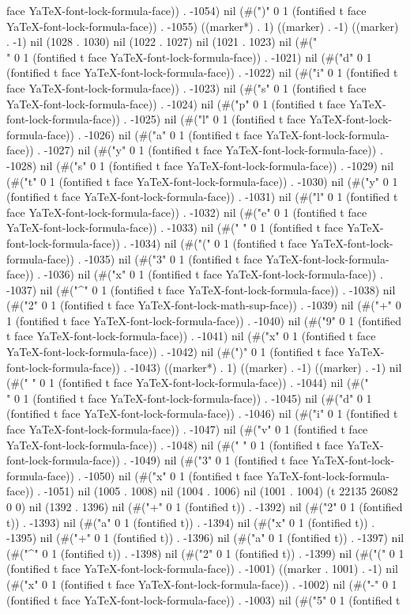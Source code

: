 face YaTeX-font-lock-formula-face)) . -1054) nil (#(")" 0 1 (fontified t face YaTeX-font-lock-formula-face)) . -1055) ((marker*) . 1) ((marker) . -1) ((marker) . -1) nil (1028 . 1030) nil (1022 . 1027) nil (1021 . 1023) nil (#("\\" 0 1 (fontified t face YaTeX-font-lock-formula-face)) . -1021) nil (#("d" 0 1 (fontified t face YaTeX-font-lock-formula-face)) . -1022) nil (#("i" 0 1 (fontified t face YaTeX-font-lock-formula-face)) . -1023) nil (#("s" 0 1 (fontified t face YaTeX-font-lock-formula-face)) . -1024) nil (#("p" 0 1 (fontified t face YaTeX-font-lock-formula-face)) . -1025) nil (#("l" 0 1 (fontified t face YaTeX-font-lock-formula-face)) . -1026) nil (#("a" 0 1 (fontified t face YaTeX-font-lock-formula-face)) . -1027) nil (#("y" 0 1 (fontified t face YaTeX-font-lock-formula-face)) . -1028) nil (#("s" 0 1 (fontified t face YaTeX-font-lock-formula-face)) . -1029) nil (#("t" 0 1 (fontified t face YaTeX-font-lock-formula-face)) . -1030) nil (#("y" 0 1 (fontified t face YaTeX-font-lock-formula-face)) . -1031) nil (#("l" 0 1 (fontified t face YaTeX-font-lock-formula-face)) . -1032) nil (#("e" 0 1 (fontified t face YaTeX-font-lock-formula-face)) . -1033) nil (#(" " 0 1 (fontified t face YaTeX-font-lock-formula-face)) . -1034) nil (#("(" 0 1 (fontified t face YaTeX-font-lock-formula-face)) . -1035) nil (#("3" 0 1 (fontified t face YaTeX-font-lock-formula-face)) . -1036) nil (#("x" 0 1 (fontified t face YaTeX-font-lock-formula-face)) . -1037) nil (#("^" 0 1 (fontified t face YaTeX-font-lock-formula-face)) . -1038) nil (#("2" 0 1 (fontified t face YaTeX-font-lock-math-sup-face)) . -1039) nil (#("+" 0 1 (fontified t face YaTeX-font-lock-formula-face)) . -1040) nil (#("9" 0 1 (fontified t face YaTeX-font-lock-formula-face)) . -1041) nil (#("x" 0 1 (fontified t face YaTeX-font-lock-formula-face)) . -1042) nil (#(")" 0 1 (fontified t face YaTeX-font-lock-formula-face)) . -1043) ((marker*) . 1) ((marker) . -1) ((marker) . -1) nil (#(" " 0 1 (fontified t face YaTeX-font-lock-formula-face)) . -1044) nil (#("\\" 0 1 (fontified t face YaTeX-font-lock-formula-face)) . -1045) nil (#("d" 0 1 (fontified t face YaTeX-font-lock-formula-face)) . -1046) nil (#("i" 0 1 (fontified t face YaTeX-font-lock-formula-face)) . -1047) nil (#("v" 0 1 (fontified t face YaTeX-font-lock-formula-face)) . -1048) nil (#(" " 0 1 (fontified t face YaTeX-font-lock-formula-face)) . -1049) nil (#("3" 0 1 (fontified t face YaTeX-font-lock-formula-face)) . -1050) nil (#("x" 0 1 (fontified t face YaTeX-font-lock-formula-face)) . -1051) nil (1005 . 1008) nil (1004 . 1006) nil (1001 . 1004) (t 22135 26082 0 0) nil (1392 . 1396) nil (#("+" 0 1 (fontified t)) . -1392) nil (#("2" 0 1 (fontified t)) . -1393) nil (#("a" 0 1 (fontified t)) . -1394) nil (#("x" 0 1 (fontified t)) . -1395) nil (#("+" 0 1 (fontified t)) . -1396) nil (#("a" 0 1 (fontified t)) . -1397) nil (#("^" 0 1 (fontified t)) . -1398) nil (#("2" 0 1 (fontified t)) . -1399) nil (#("(" 0 1 (fontified t face YaTeX-font-lock-formula-face)) . -1001) ((marker . 1001) . -1) nil (#("x" 0 1 (fontified t face YaTeX-font-lock-formula-face)) . -1002) nil (#("-" 0 1 (fontified t face YaTeX-font-lock-formula-face)) . -1003) nil (#("5" 0 1 (fontified t 